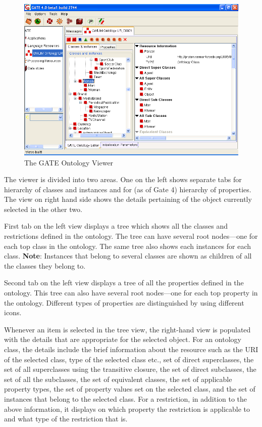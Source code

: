 {\begin{figure}[htbp]
\begin{center}
\includegraphics[scale=0.5]{ontology-vr.png}
\caption{The GATE Ontology Viewer}
\label{fig:ontology-vr}
\end{center}
\end{figure}


The viewer is divided into two areas. One on the left shows separate tabs for
hierarchy of classes and instances and for (as of Gate 4) hierarchy of
properties. The view on right hand side shows the details pertaining of the
object currently selected in the other two.

First tab on the left view displays a tree which shows all the classes and
restrictions defined in the ontology. The tree can have several root
nodes---one for each top class in the ontology. The same tree also shows each
instances for each class. \textbf{Note}: Instances that belong to several classes are shown as children
of all the classes they belong to.

Second tab on the left view displays a tree of all the properties defined in the
ontology. This tree can also have several root nodes---one for each top property
in the ontology.  Different types of properties are distinguished by using
different icons.

Whenever an item is selected in the tree view, the right-hand view is populated with
the details that are appropriate for the selected object. For an ontology class, the
details include the brief information about the resource such as the URI of the
selected class, type of the selected class etc., set of direct superclasses, the
set of all superclasses using the transitive closure, the set of direct
subclasses, the set of all the subclasses, the set of equivalent classes, the
set of applicable property types, the set of property values set on the selected
class, and the set of instances that belong to the selected class. For a
restriction, in addition to the above information, it displays on which
property the restriction is applicable to and  what type of the restriction
that is.

}
